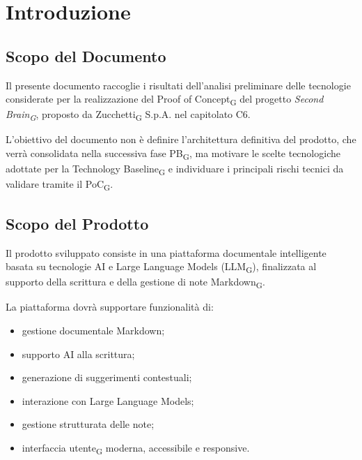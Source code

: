 \section{Introduzione}

\subsection{Scopo del Documento}
Il presente documento raccoglie i risultati dell'analisi preliminare delle tecnologie considerate
per la realizzazione del Proof of Concept\textsubscript{G} del progetto \textit{Second Brain\textsubscript{G}}, proposto da
Zucchetti\textsubscript{G} S.p.A. nel capitolato C6.

L'obiettivo del documento non è definire l'architettura definitiva del prodotto, che verrà
consolidata nella successiva fase PB\textsubscript{G}, ma motivare le scelte tecnologiche adottate per la
Technology Baseline\textsubscript{G} e individuare i principali rischi tecnici da validare tramite il PoC\textsubscript{G}.

\subsection{Scopo del Prodotto}

Il prodotto sviluppato consiste in una piattaforma documentale intelligente basata su tecnologie AI e Large Language Models (LLM\textsubscript{G}), finalizzata al supporto della scrittura e della gestione di note Markdown\textsubscript{G}.

La piattaforma dovrà supportare funzionalità di:
\begin{itemize}
    \item gestione documentale Markdown;
    \item supporto AI alla scrittura;
    \item generazione di suggerimenti contestuali;
    \item interazione con Large Language Models;
    \item gestione strutturata delle note;
    \item interfaccia utente\textsubscript{G} moderna, accessibile e responsive.
\end{itemize}


